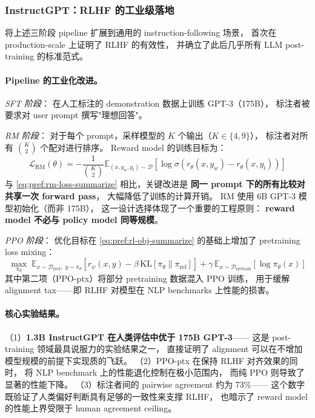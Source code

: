 \subsubsection{InstructGPT：RLHF 的工业级落地}
\label{sec:t2-instructgpt}

 将上述三阶段 pipeline 扩展到通用的 instruction-following 场景，
首次在 production-scale 上证明了 RLHF 的有效性，
并确立了此后几乎所有 LLM post-training 的标准范式。

\paragraph{Pipeline 的工业化改进。}

\textit{SFT 阶段}：
在人工标注的 demonstration 数据上训练 GPT-3（175B），
标注者被要求对 user prompt 撰写"理想回答"。

\textit{RM 阶段}：
对于每个 prompt，采样模型的 $K$ 个输出（$K \in \{4, 9\}$），
标注者对所有 $\binom{K}{2}$ 个配对进行排序。
Reward model 的训练目标为：
\begin{equation}
\label{eq:pref:rm-loss-instructgpt}
\mathcal{L}_{\text{RM}}(\theta) = -\frac{1}{\binom{K}{2}} \mathbb{E}_{(x, y_w, y_l) \sim \mathcal{D}} \left[
  \log \sigma\!\left(r_\theta(x, y_w) - r_\theta(x, y_l)\right)
\right]
\end{equation}
与 \cref{eq:pref:rm-loss-summarize} 相比，关键改进是
\textbf{同一 prompt 下的所有比较对共享一次 forward pass}，
大幅降低了训练的计算开销。
RM 使用 6B GPT-3 模型初始化（而非 175B），
这一设计选择体现了一个重要的工程原则：
\textbf{reward model 不必与 policy model 同等规模}。

\textit{PPO 阶段}：
优化目标在 \cref{eq:pref:rl-obj-summarize} 的基础上增加了 pretraining loss mixing：
\begin{equation}
\label{eq:pref:ppo-ptx}
\max_{\pi_\theta}\; \mathbb{E}_{x \sim \mathcal{D}_{\text{pref}},\; y \sim \pi_\theta}
  \left[r_\psi(x, y) - \beta \,\text{KL}\!\left[\pi_\theta \| \pi_{\text{ref}}\right]\right]
  + \gamma\,\mathbb{E}_{x \sim \mathcal{D}_{\text{pretrain}}}\left[\log \pi_\theta(x)\right]
\end{equation}
其中第二项（PPO-ptx）将部分 pretraining 数据混入 PPO 训练，
用于缓解 alignment tax——即 RLHF 对模型在 NLP benchmarks 上性能的损害。

\paragraph{核心实验结果。}
（1）\textbf{1.3B InstructGPT 在人类评估中优于 175B GPT-3}——
这是 post-training 领域最具说服力的实验结果之一，
直接证明了 alignment 可以在不增加模型规模的前提下实现质的飞跃。
（2）PPO-ptx 在保持 RLHF 对齐效果的同时，
将 NLP benchmark 上的性能退化控制在极小范围内，
而纯 PPO 则导致了显著的性能下降。
（3）标注者间的 pairwise agreement 约为 73\%——
这个数字既验证了人类偏好判断具有足够的一致性来支撑 RLHF，
也暗示了 reward model 的性能上界受限于 human agreement ceiling。

